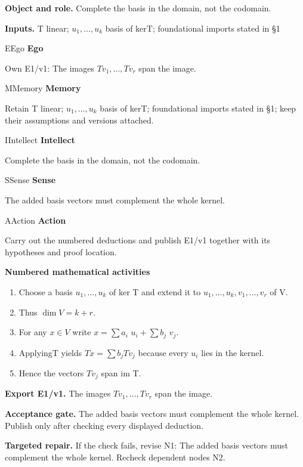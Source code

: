 \documentclass[preprint,12pt,aps,pra,showkeys,amsmath,amssymb,superscriptaddress,floatfix]{revtex4-2}
\theoremstyle{definition}
\theoremstyle{remark}
\newcommand{\mmfaculty}[3]{%
 \begin{mmfacultybox}{#1}{#2}
 {\sffamily\bfseries\color{MMBlue}#2}\par\smallskip #3
 \end{mmfacultybox}}
\newcommand{\field}[2]{\par\smallskip\noindent\textbf{#1.} #2\par}
\begin{document}
\field{Object and role}{Complete the basis in the domain, not the codomain.}

\field{Inputs}{T linear; \(u_{1},\ldots ,u_k\) basis of kerT; foundational imports
stated in §1}

\mmfaculty{E}{Ego}{Own E1/v1: The images \(Tv_{1},\ldots ,Tv_r\) span the image.}

\mmfaculty{M}{Memory}{Retain T linear; \(u_{1},\ldots ,u_k\) basis of kerT; foundational
imports stated in §1; keep their assumptions and versions attached.}

\mmfaculty{I}{Intellect}{Complete the basis in the domain, not the codomain.}

\mmfaculty{S}{Sense}{The added basis vectors must complement the whole kernel.}

\mmfaculty{A}{Action}{Carry out the numbered deductions and publish E1/v1 together with its
hypotheses and proof location.}

\smallskip\noindent\textbf{Numbered mathematical activities}

\begin{enumerate}[label=N1.\arabic*,leftmargin=3.4em]

\item Choose a basis \(u_{1},\ldots ,u_k\) of ker T and extend it to
\(u_{1},\ldots ,u_k,v_{1},\ldots ,v_r\) of V.

\item Thus \(\operatorname{dim} V=k+r\).

\item For any \(x\in V\) write \(x=\sum a_i\) \(u_i+\sum b_j\) \(v_j\).

\item ApplyingT yields \(Tx=\sum b_jTv_j\) because every \(u_i\) lies in the
kernel.

\item Hence the vectors \(Tv_j\) span im T.

\end{enumerate}

\field{Export E1/v1}{The images \(Tv_{1},\ldots ,Tv_r\) span the image.}

\field{Acceptance gate}{The added basis vectors must complement the whole kernel. Publish only
after checking every displayed deduction.}

\field{Targeted repair}{If the check fails, revise N1: The added basis vectors must complement
the whole kernel. Recheck dependent nodes N2.}

\clearpage
\end{document}
